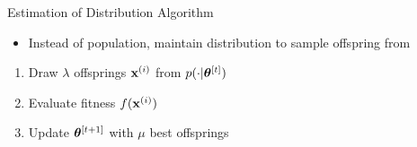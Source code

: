\documentclass[11pt,compress,t,notes=noshow, xcolor=table]{beamer}
\begin{document}
\begin{frame}{Estimation of Distribution Algorithm}

\begin{minipage}{0.62\textwidth}
\begin{itemize}
    \item Instead of population, maintain distribution to sample offspring from
\end{itemize}

\vspace{\baselineskip}

\begin{enumerate}
    \item Draw $\lambda$ offsprings $\mathbf{x}^{(i)}$ from $p(\cdot|\bm{\theta}^{[t]})$
    \item Evaluate fitness $f(\mathbf{x}^{(i)})$ 
    \item Update $\bm{\theta}^{[t+1]}$ with $\mu$ best offsprings
\end{enumerate}


\end{minipage}
\end{frame}
\end{document}
